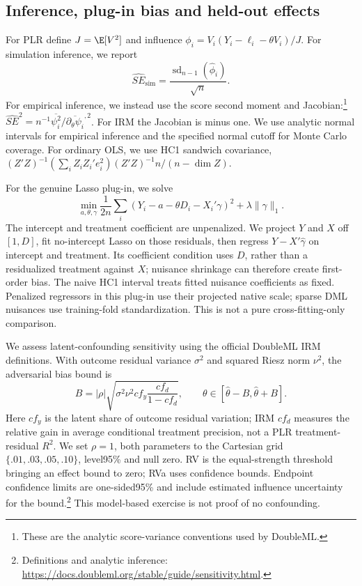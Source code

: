 \subsection{Inference, plug-in bias and held-out effects}
For PLR define $J=\E[V^2]$ and influence $\phi_i=V_i(Y_i-\ell_i-\theta V_i)/J$. For simulation inference, we report
\begin{equation}
 \widehat{SE}_{\mathrm{sim}}=\frac{\operatorname{sd}_{n-1}(\widehat\phi_i)}{\sqrt n}.
\end{equation}
For empirical inference, we instead use the score second moment and Jacobian:\footnote{These are the analytic score-variance conventions used by DoubleML.} $\widehat{SE}^{2}=n^{-1}\overline{\psi_i^2}/\overline{\partial_\theta\psi_i}^{,2}$. For IRM the Jacobian is minus one. We use analytic normal intervals for empirical inference and the specified normal cutoff for Monte Carlo coverage. For ordinary OLS, we use HC1 sandwich covariance, $(Z'Z)^{-1}(\sum_i Z_iZ_i'e_i^2)(Z'Z)^{-1}n/(n-\dim Z)$.

For the genuine Lasso plug-in, we solve
\begin{equation}
 \min_{a,\theta,\gamma}\frac{1}{2n}\sum_i(Y_i-a-\theta D_i-X_i'\gamma)^2+\lambda\|\gamma\|_1.
\end{equation}
The intercept and treatment coefficient are unpenalized. We project $Y$ and $X$ off $[1, D]$, fit no-intercept Lasso on those residuals, then regress $Y-X'\widehat\gamma$ on intercept and treatment. Its coefficient condition uses $D$, rather than a residualized treatment against $X$; nuisance shrinkage can therefore create first-order bias. The naive HC1 interval treats fitted nuisance coefficients as fixed. Penalized regressors in this plug-in use their projected native scale; sparse DML nuisances use training-fold standardization. This is not a pure cross-fitting-only comparison.

We assess latent-confounding sensitivity using the official DoubleML IRM definitions. With outcome residual variance $\sigma^2$ and squared Riesz norm $\nu^2$, the adversarial bias bound is
\begin{equation}
 B=|\rho|\sqrt{\sigma^2\nu^2 cf_y\frac{cf_d}{1-cf_d}},\qquad \theta\in[\widehat\theta-B,\widehat\theta+B].
\end{equation}
Here $cf_y$ is the latent share of outcome residual variation; IRM $cf_d$ measures the relative gain in average conditional treatment precision, not a PLR treatment-residual $R^2$. We set $\rho=1$, both parameters to the Cartesian grid $\{.01,.03,.05,.10\}$, level95\% and null zero. RV is the equal-strength threshold bringing an effect bound to zero; RVa uses confidence bounds. Endpoint confidence limits are one-sided95\% and include estimated influence uncertainty for the bound.\footnote{Definitions and analytic inference: \url{https://docs.doubleml.org/stable/guide/sensitivity.html}.} This model-based exercise is not proof of no confounding.

